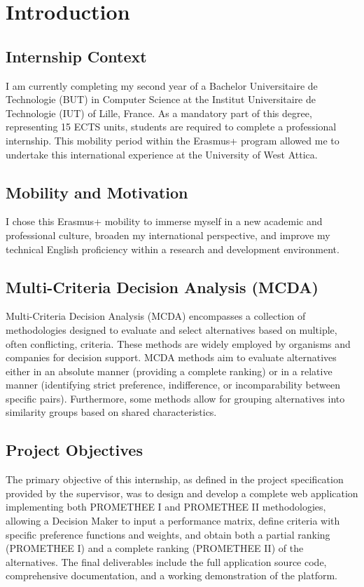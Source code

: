 \documentclass[12pt,a4paper,oneside]{report}
\begin{document}
\chapter{Introduction}

\section{Internship Context}
I am currently completing my second year of a Bachelor Universitaire de Technologie (BUT) in Computer Science at the Institut Universitaire de Technologie (IUT) of Lille, France. As a mandatory part of this degree, representing 15 ECTS units, students are required to complete a professional internship. This mobility period within the Erasmus+ program allowed me to undertake this international experience at the University of West Attica.

\section{Mobility and Motivation}
I chose this Erasmus+ mobility to immerse myself in a new academic and professional culture, broaden my international perspective, and improve my technical English proficiency within a research and development environment.

\section{Multi-Criteria Decision Analysis (MCDA)}
Multi-Criteria Decision Analysis (MCDA) encompasses a collection of methodologies designed to evaluate and select alternatives based on multiple, often conflicting, criteria. These methods are widely employed by organisms and companies for decision support. MCDA methods aim to evaluate alternatives either in an absolute manner (providing a complete ranking) or in a relative manner (identifying strict preference, indifference, or incomparability between specific pairs). Furthermore, some methods allow for grouping alternatives into similarity groups based on shared characteristics.

\section{Project Objectives}
The primary objective of this internship, as defined in the project specification provided by the supervisor, was to design and develop a complete web application implementing both PROMETHEE I and PROMETHEE II methodologies, allowing a Decision Maker to input a performance matrix, define criteria with specific preference functions and weights, and obtain both a partial ranking (PROMETHEE I) and a complete ranking (PROMETHEE II) of the alternatives. The final deliverables include the full application source code, comprehensive documentation, and a working demonstration of the platform.
\end{document}
